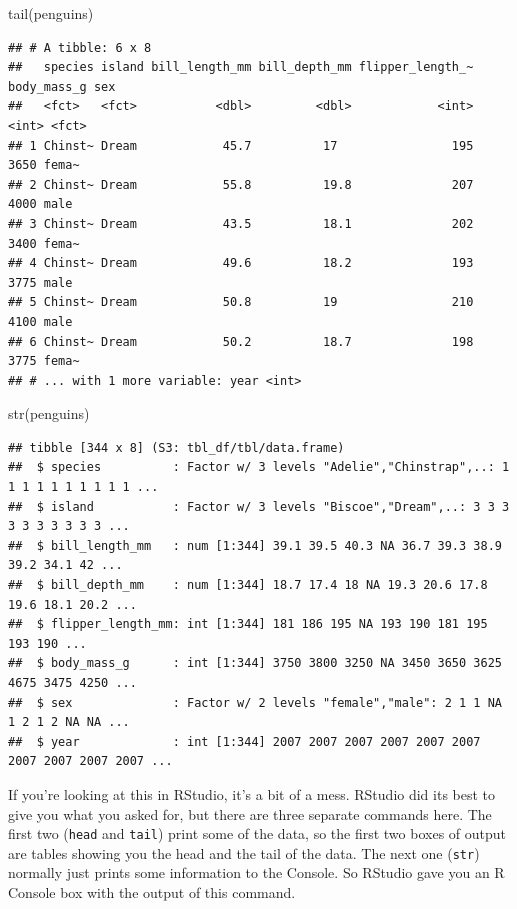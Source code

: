 \documentclass[
]{book}
\newenvironment{Shaded}{\begin{snugshade}}{\end{snugshade}}
\newcommand{\FunctionTok}[1]{\textcolor[rgb]{0.00,0.00,0.00}{#1}}
\newcommand{\NormalTok}[1]{#1}
\begin{document}
\begin{Shaded}
\begin{Highlighting}[]
\FunctionTok{tail}\NormalTok{(penguins)}
\end{Highlighting}
\end{Shaded}

\begin{verbatim}
## # A tibble: 6 x 8
##   species island bill_length_mm bill_depth_mm flipper_length_~ body_mass_g sex  
##   <fct>   <fct>           <dbl>         <dbl>            <int>       <int> <fct>
## 1 Chinst~ Dream            45.7          17                195        3650 fema~
## 2 Chinst~ Dream            55.8          19.8              207        4000 male 
## 3 Chinst~ Dream            43.5          18.1              202        3400 fema~
## 4 Chinst~ Dream            49.6          18.2              193        3775 male 
## 5 Chinst~ Dream            50.8          19                210        4100 male 
## 6 Chinst~ Dream            50.2          18.7              198        3775 fema~
## # ... with 1 more variable: year <int>
\end{verbatim}

\begin{Shaded}
\begin{Highlighting}[]
\FunctionTok{str}\NormalTok{(penguins)}
\end{Highlighting}
\end{Shaded}

\begin{verbatim}
## tibble [344 x 8] (S3: tbl_df/tbl/data.frame)
##  $ species          : Factor w/ 3 levels "Adelie","Chinstrap",..: 1 1 1 1 1 1 1 1 1 1 ...
##  $ island           : Factor w/ 3 levels "Biscoe","Dream",..: 3 3 3 3 3 3 3 3 3 3 ...
##  $ bill_length_mm   : num [1:344] 39.1 39.5 40.3 NA 36.7 39.3 38.9 39.2 34.1 42 ...
##  $ bill_depth_mm    : num [1:344] 18.7 17.4 18 NA 19.3 20.6 17.8 19.6 18.1 20.2 ...
##  $ flipper_length_mm: int [1:344] 181 186 195 NA 193 190 181 195 193 190 ...
##  $ body_mass_g      : int [1:344] 3750 3800 3250 NA 3450 3650 3625 4675 3475 4250 ...
##  $ sex              : Factor w/ 2 levels "female","male": 2 1 1 NA 1 2 1 2 NA NA ...
##  $ year             : int [1:344] 2007 2007 2007 2007 2007 2007 2007 2007 2007 2007 ...
\end{verbatim}

If you're looking at this in RStudio, it's a bit of a mess. RStudio did its best to give you what you asked for, but there are three separate commands here. The first two (\texttt{head} and \texttt{tail}) print some of the data, so the first two boxes of output are tables showing you the head and the tail of the data. The next one (\texttt{str}) normally just prints some information to the Console. So RStudio gave you an R Console box with the output of this command.
\end{document}
